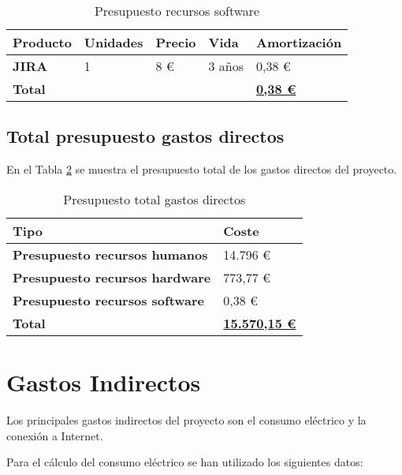 \begin{table}[H]\label{tab:preprecsw}
	\centering
	\begin{tabular}{|l|l|l|l|l|}
		\hline
		\textbf{Producto} & \textbf{Unidades} & \textbf{Precio} & \textbf{Vida} & \textbf{Amortización} \\ \hline
		\textbf{JIRA}     & 1                 & 8 € \cite{Tfg:jiraprice} & 3 años        & 0,38 €                \\ \hline
		\multicolumn{4}{|l|}{\textbf{Total}} & \textbf{\underline{0,38 €}}                               \\ \hline
	\end{tabular}
	\caption{Presupuesto recursos software}
\end{table}

\subsection{Total presupuesto gastos directos}
En el Tabla \ref{tab:preptotal} se muestra el presupuesto total de los gastos directos del proyecto.

\begin{table}[H]\label{tab:preptotal}
	\centering
	\begin{tabular}{|l|l|}
		\hline
		\textbf{Tipo}                          & \textbf{Coste}                   \\ \hline
		\textbf{Presupuesto recursos humanos}  & 14.796 €                         \\ \hline
		\textbf{Presupuesto recursos hardware} & 773,77 €                         \\ \hline
		\textbf{Presupuesto recursos software} &0,38 €                            \\ \hline
		\textbf{Total}                         & \textbf{\underline{15.570,15 €}} \\ \hline
	\end{tabular}
	\caption{Presupuesto total gastos directos}
\end{table}

\section{Gastos Indirectos}

Los principales gastos indirectos del proyecto son el consumo eléctrico y la conexión a Internet. 

Para el cálculo del consumo eléctrico se han utilizado los siguientes datos:

